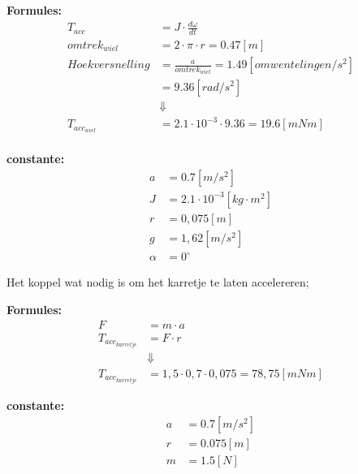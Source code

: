     \begin{multicols}{2}
        \textbf{Formules:}
        \begin{equation}
            \begin{split}
                T_{acc} &= J \cdot \frac{d \omega}{dt} \\
                omtrek_{wiel} &= 2 \cdot \pi \cdot r = 0.47 [m] \\
                Hoekversnelling &= \frac{a}{omtrek_{wiel}} = 1.49 [omwentelingen/s^2] \\
                &= 9.36 [rad/s^2] \\
                &\Downarrow \\
                T_{acc_{wiel}} &= 2.1 \cdot 10^{-3} \cdot 9.36 = 19.6 [mNm]\\
            \end{split}
        \end{equation}

        \textbf{constante:}
        \begin{equation*}
            \begin{split}
                a &= 0.7 [m/s^2] \\
                J &= 2.1 \cdot 10^{-3} [kg \cdot m^2]\\
                r &= 0,075 [m] \\
                g &= 1,62 [m/s^2] \\
                \alpha &= 0^\circ 
            \end{split}
        \end{equation*}
    \end{multicols}

Het koppel wat nodig is om het karretje te laten accelereren;

    \begin{multicols}{2}
        \textbf{Formules:}
        \begin{equation}
            \begin{split}
                F &= m \cdot a \\
                T_{acc_{karretje}} &= F \cdot r \\
                &\Downarrow \\
                T_{acc_{karretje}} &= 1,5 \cdot 0,7 \cdot 0,075 = 78,75 [mNm]
            \end{split}
        \end{equation}

        \textbf{constante:}
        \begin{equation*}
            \begin{split}
                a &= 0.7 [m/s^2] \\
                r &= 0.075 [m] \\
                m &= 1.5 [N] 
            \end{split}
        \end{equation*}
    \end{multicols}

